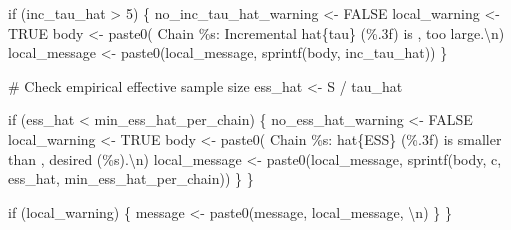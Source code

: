 \documentclass[
  letterpaper,
  DIV=11,
  numbers=noendperiod]{scrartcl}
\newenvironment{Shaded}{\begin{snugshade}}{\end{snugshade}}
\newcommand{\CharTok}[1]{\textcolor[rgb]{0.13,0.47,0.30}{#1}}
\newcommand{\CommentTok}[1]{\textcolor[rgb]{0.37,0.37,0.37}{#1}}
\newcommand{\ControlFlowTok}[1]{\textcolor[rgb]{0.00,0.23,0.31}{#1}}
\newcommand{\DecValTok}[1]{\textcolor[rgb]{0.68,0.00,0.00}{#1}}
\newcommand{\NormalTok}[1]{\textcolor[rgb]{0.00,0.23,0.31}{#1}}
\newcommand{\OperatorTok}[1]{\textcolor[rgb]{0.37,0.37,0.37}{#1}}
\newcommand{\SpecialCharTok}[1]{\textcolor[rgb]{0.37,0.37,0.37}{#1}}
\newcommand{\StringTok}[1]{\textcolor[rgb]{0.13,0.47,0.30}{#1}}
\begin{document}
\begin{Shaded}
\begin{Highlighting}[]
      \ControlFlowTok{if}\NormalTok{ (inc\_tau\_hat }\OperatorTok{\textgreater{}} \DecValTok{5}\NormalTok{) \{}
\NormalTok{        no\_inc\_tau\_hat\_warning }\OperatorTok{\textless{}{-}}\NormalTok{ FALSE}
\NormalTok{        local\_warning }\OperatorTok{\textless{}{-}}\NormalTok{ TRUE}
\NormalTok{        body }\OperatorTok{\textless{}{-}}\NormalTok{ paste0(}\StringTok{\textquotesingle{}  Chain }\SpecialCharTok{\%s}\StringTok{: Incremental hat}\SpecialCharTok{\{tau\}}\StringTok{ (}\SpecialCharTok{\%.3f}\StringTok{) is \textquotesingle{}}\NormalTok{,}
                       \StringTok{\textquotesingle{}too large.}\CharTok{\textbackslash{}n}\StringTok{\textquotesingle{}}\NormalTok{)}
\NormalTok{        local\_message }\OperatorTok{\textless{}{-}}\NormalTok{ paste0(local\_message,}
\NormalTok{                                sprintf(body, inc\_tau\_hat))}
\NormalTok{      \}}

      \CommentTok{\# Check empirical effective sample size}
\NormalTok{      ess\_hat }\OperatorTok{\textless{}{-}}\NormalTok{ S }\OperatorTok{/}\NormalTok{ tau\_hat}
      
      \ControlFlowTok{if}\NormalTok{ (ess\_hat }\OperatorTok{\textless{}}\NormalTok{ min\_ess\_hat\_per\_chain) \{}
\NormalTok{        no\_ess\_hat\_warning }\OperatorTok{\textless{}{-}}\NormalTok{ FALSE}
\NormalTok{        local\_warning }\OperatorTok{\textless{}{-}}\NormalTok{ TRUE}
\NormalTok{        body }\OperatorTok{\textless{}{-}}\NormalTok{ paste0(}\StringTok{\textquotesingle{}  Chain }\SpecialCharTok{\%s}\StringTok{: hat}\SpecialCharTok{\{ESS\}}\StringTok{ (}\SpecialCharTok{\%.3f}\StringTok{) is smaller than \textquotesingle{}}\NormalTok{,}
                       \StringTok{\textquotesingle{}desired (}\SpecialCharTok{\%s}\StringTok{).}\CharTok{\textbackslash{}n}\StringTok{\textquotesingle{}}\NormalTok{)}
\NormalTok{        local\_message }\OperatorTok{\textless{}{-}}\NormalTok{ paste0(local\_message,}
\NormalTok{                                sprintf(body, c, ess\_hat,}
\NormalTok{                                        min\_ess\_hat\_per\_chain))}
\NormalTok{      \}}
\NormalTok{    \}}
    
    \ControlFlowTok{if}\NormalTok{ (local\_warning) \{}
\NormalTok{      message }\OperatorTok{\textless{}{-}}\NormalTok{ paste0(message, local\_message, }\StringTok{\textquotesingle{}}\CharTok{\textbackslash{}n}\StringTok{\textquotesingle{}}\NormalTok{)}
\NormalTok{    \}}
\NormalTok{  \}}


\end{Highlighting}
\end{Shaded}
\end{document}
